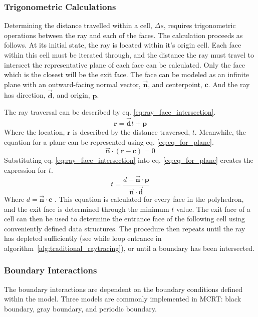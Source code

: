 \subsubsection{Trigonometric Calculations}
Determining the distance travelled within a cell, $\Delta{s}$, requires trigonometric operations between the ray and each of the faces.
The calculation proceeds as follows. At its initial state, the ray is located within it's origin cell. Each face within this cell must be iterated through, and the distance the ray must travel to intersect the representative plane of each face can be calculated. 
Only the face which is the closest will be the exit face. 
The face can be modeled as an infinite plane with an outward-facing normal vector, $\Vec{\textbf{n}}$, and centerpoint, $\textbf{c}$.
And the ray has direction, $\Vec{\textbf{d}}$, and origin, $\textbf{p}$. 


The ray traversal can be described by eq. \ref{eq:ray_face_intersection}.
\begin{equation}
    \textbf{r} = \Vec{\textbf{d}}t + \textbf{p}
    \label{eq:ray_face_intersection}
\end{equation}
Where the location, $\textbf{r}$ is described by the distance traversed, $t$.
Meanwhile, the equation for a plane can be represented using eq. \ref{eq:eq_for_plane}.
\begin{equation}
    \Vec{\textbf{n}} \cdot (\textbf{r} - \textbf{c}) = 0
    \label{eq:eq_for_plane}
\end{equation}
Substituting eq. \ref{eq:ray_face_intersection} into eq. \ref{eq:eq_for_plane} creates the expression for $t$.
\begin{equation}
    t=\frac{d-\Vec{\textbf{n}}\cdot\textbf{p}}{\Vec{\textbf{n}}\cdot\Vec{\textbf{d}}}
    \label{eq:eq_for_plane}
\end{equation}
Where $d=\Vec{\textbf{n}}\cdot\textbf{c}$ \cite{Kay1986RayScenes}. This equation is calculated for every face in the polyhedron, and the exit face is determined through the minimum $t$ value. The exit face of a cell can then be used to determine the entrance face of the following cell using conveniently defined data structures.
The procedure then repeats until the ray has depleted sufficiently (see while loop entrance in algorithm~\ref{alg:traditional_raytracing}), or until a boundary has been intersected.

\subsubsection{Boundary Interactions}
The boundary interactions are dependent on the boundary conditions defined within the model. Three models are commonly implemented in MCRT: black boundary, gray boundary, and periodic boundary.


